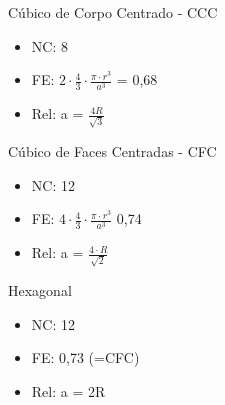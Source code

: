 Cúbico de Corpo Centrado - CCC
\begin{itemize}
	\setlength{\parskip}{0pt}
	\setlength{\itemsep}{0pt plus 1pt}
	
	\item NC: 8
	\item FE: $2 \cdot \frac{4}{3} \cdot \frac{\pi \cdot r^{3}}{a^{3}}$ = 0,68
	\item Rel: a = $\frac{4R}{\sqrt{3}}$
\end{itemize}


Cúbico de Faces Centradas - CFC
\begin{itemize}
	\setlength{\parskip}{0pt}
	\setlength{\itemsep}{0pt plus 1pt}
	
	\item NC: 12
	\item FE: $4 \cdot \frac{4}{3} \cdot \frac{\pi \cdot r^{3}}{a^{3}}$ 0,74
	\item Rel: a = $\frac{4 \cdot R}{\sqrt{2}}$
\end{itemize}

Hexagonal
\begin{itemize}
	
	\setlength{\parskip}{0pt}
	\setlength{\itemsep}{0pt plus 1pt}
	
	\item NC: 12
	\item FE: 0,73 (=CFC)
	\item Rel: a = 2R
\end{itemize}


